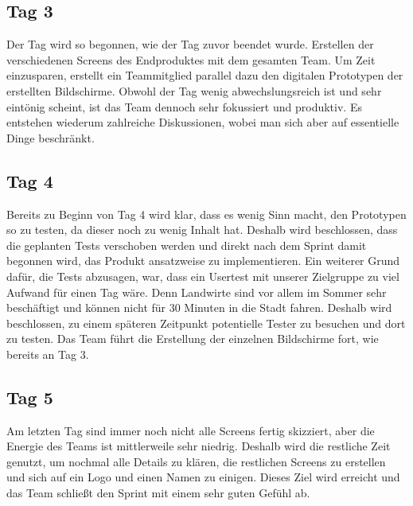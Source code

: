 \subsection*{Tag 3}
Der Tag wird so begonnen, wie der Tag zuvor beendet wurde. Erstellen der verschiedenen Screens des Endproduktes mit dem gesamten Team. Um Zeit einzusparen, erstellt ein Teammitglied parallel dazu den digitalen Prototypen der erstellten Bildschirme. Obwohl der Tag wenig abwechslungsreich ist und sehr eintönig scheint, ist das Team dennoch sehr fokussiert und produktiv. Es entstehen wiederum zahlreiche Diskussionen, wobei man sich aber auf essentielle Dinge beschränkt.

\subsection*{Tag 4}
Bereits zu Beginn von Tag 4 wird klar, dass es wenig Sinn macht, den Prototypen so zu testen, da dieser noch zu wenig Inhalt hat. Deshalb wird beschlossen, dass die geplanten Tests verschoben werden und direkt nach dem Sprint damit begonnen wird, das Produkt ansatzweise zu implementieren. Ein weiterer Grund dafür, die Tests abzusagen, war, dass ein Usertest mit unserer Zielgruppe zu viel Aufwand für einen Tag wäre. Denn Landwirte sind vor allem im Sommer sehr beschäftigt und können nicht für 30 Minuten in die Stadt fahren. Deshalb wird beschlossen, zu einem späteren Zeitpunkt potentielle Tester zu besuchen und dort zu testen. Das Team führt die Erstellung der einzelnen Bildschirme fort, wie bereits an Tag 3.

\subsection*{Tag 5}
Am letzten Tag sind immer noch nicht alle Screens fertig skizziert, aber die Energie des Teams ist mittlerweile sehr niedrig. Deshalb wird die restliche Zeit genutzt, um nochmal alle Details zu klären, die restlichen Screens zu erstellen und sich auf ein Logo und einen Namen zu einigen. Dieses Ziel wird erreicht und das Team schließt den Sprint mit einem sehr guten Gefühl ab.

